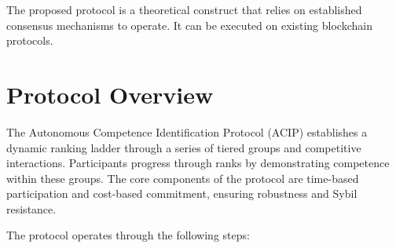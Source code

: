 \documentclass{article}
\begin{document}
\begin{CJK}{UTF8}{gbsn}
    The proposed protocol is a theoretical construct that relies on established consensus mechanisms to operate. It can be executed on existing blockchain protocols.

    \section{Protocol Overview}

    The Autonomous Competence Identification Protocol (ACIP) establishes a dynamic ranking ladder through a series of tiered groups and competitive interactions. Participants progress through ranks by demonstrating competence within these groups. The core components of the protocol are time-based participation and cost-based commitment, ensuring robustness and Sybil resistance.

    The protocol operates through the following steps:


\end{CJK}
\end{document}
